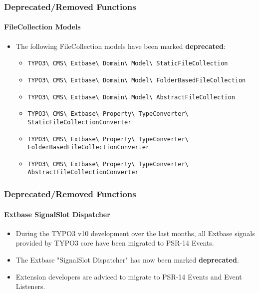 \begin{frame}[fragile]
	\frametitle{Deprecated/Removed Functions}
	\framesubtitle{FileCollection Models}

	\begin{itemize}
		\item The following FileCollection models have been marked \textbf{deprecated}:
			\vspace{0.4cm}
			\begin{itemize}\tiny
				\item \texttt{TYPO3\textbackslash
					CMS\textbackslash
					Extbase\textbackslash
					Domain\textbackslash
					Model\textbackslash
					StaticFileCollection}

				\item \texttt{TYPO3\textbackslash
					CMS\textbackslash
					Extbase\textbackslash
					Domain\textbackslash
					Model\textbackslash
					FolderBasedFileCollection}

				\item \texttt{TYPO3\textbackslash
					CMS\textbackslash
					Extbase\textbackslash
					Domain\textbackslash
					Model\textbackslash
					AbstractFileCollection}

				\item \texttt{TYPO3\textbackslash
					CMS\textbackslash
					Extbase\textbackslash
					Property\textbackslash
					TypeConverter\textbackslash
					StaticFileCollectionConverter}

				\item \texttt{TYPO3\textbackslash
					CMS\textbackslash
					Extbase\textbackslash
					Property\textbackslash
					TypeConverter\textbackslash
					FolderBasedFileCollectionConverter}

				\item \texttt{TYPO3\textbackslash
					CMS\textbackslash
					Extbase\textbackslash
					Property\textbackslash
					TypeConverter\textbackslash
					AbstractFileCollectionConverter}

			\end{itemize}

	\end{itemize}

\end{frame}


\begin{frame}[fragile]
	\frametitle{Deprecated/Removed Functions}
	\framesubtitle{Extbase SignalSlot Dispatcher}

	\begin{itemize}
		\item During the TYPO3 v10 development over the last months,
			all Extbase signals provided by TYPO3 core have been migrated to PSR-14 Events.
		\item The Extbase "SignalSlot Dispatcher" has now been marked \textbf{deprecated}.
		\item Extension developers are adviced to migrate to PSR-14 Events and Event Listeners.
	\end{itemize}

\end{frame}

